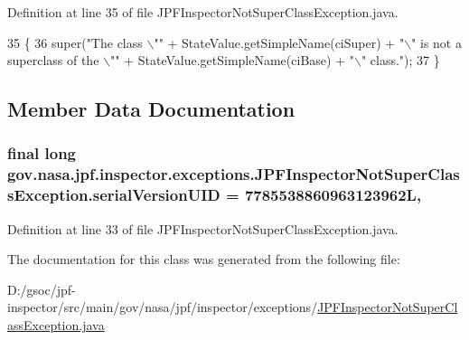 Definition at line 35 of file J\+P\+F\+Inspector\+Not\+Super\+Class\+Exception.\+java.


\begin{DoxyCode}
35                                                                                   \{
36     super(\textcolor{stringliteral}{"The class \(\backslash\)""} + StateValue.getSimpleName(ciSuper) + \textcolor{stringliteral}{"\(\backslash\)" is not a superclass of the \(\backslash\)""} + 
      StateValue.getSimpleName(ciBase) + \textcolor{stringliteral}{"\(\backslash\)" class."});
37   \}
\end{DoxyCode}


\subsection{Member Data Documentation}
\subsubsection[{\texorpdfstring{serial\+Version\+U\+ID}{serialVersionUID}}]{\setlength{\rightskip}{0pt plus 5cm}final long gov.\+nasa.\+jpf.\+inspector.\+exceptions.\+J\+P\+F\+Inspector\+Not\+Super\+Class\+Exception.\+serial\+Version\+U\+ID = 7785538860963123962L\hspace{0.3cm}{\ttfamily [static]}, {\ttfamily [private]}}\hypertarget{classgov_1_1nasa_1_1jpf_1_1inspector_1_1exceptions_1_1_j_p_f_inspector_not_super_class_exception_a7115d1996c4298b9578125ccc07f81e8}{}\label{classgov_1_1nasa_1_1jpf_1_1inspector_1_1exceptions_1_1_j_p_f_inspector_not_super_class_exception_a7115d1996c4298b9578125ccc07f81e8}


Definition at line 33 of file J\+P\+F\+Inspector\+Not\+Super\+Class\+Exception.\+java.



The documentation for this class was generated from the following file\+:\begin{DoxyCompactItemize}
\item 
D\+:/gsoc/jpf-\/inspector/src/main/gov/nasa/jpf/inspector/exceptions/\hyperlink{_j_p_f_inspector_not_super_class_exception_8java}{J\+P\+F\+Inspector\+Not\+Super\+Class\+Exception.\+java}\end{DoxyCompactItemize}
